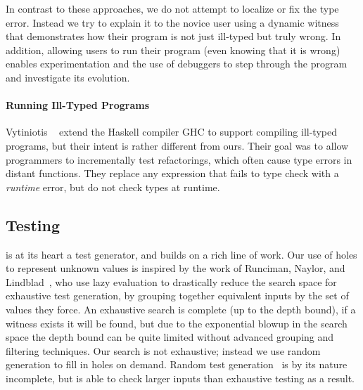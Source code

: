 In contrast to these approaches, we do not attempt to localize or fix
the type error. Instead we try to explain it to the novice user using a
dynamic witness that demonstrates how their program is not just
ill-typed but truly wrong. In addition, allowing users to run their
program (even knowing that it is wrong) enables experimentation and the
use of debuggers to step through the program and investigate its
evolution.

\paragraph{Running Ill-Typed Programs}
\label{sec:running-ill-typed}
Vytiniotis \etal~\cite{vytiniotis_equality_2012} extend the Haskell
compiler GHC to support compiling ill-typed programs, but their intent
is rather different from ours. Their goal was to allow programmers to
incrementally test refactorings, which often cause type errors in
distant functions. They replace any expression that fails to type
check with a \emph{runtime} error, but do not check types
at runtime.

\subsection{Testing}
\label{sec:testing}
\nanomaly is at its heart a test generator, and builds on a rich line of
work.
%
Our use of holes to represent unknown values is inspired by the work of
Runciman, Naylor, and Lindblad~\cite{runciman_smallcheck_2008,naylor_finding_2007,lindblad_property_2007},
%
who use lazy evaluation to drastically reduce the search space for
exhaustive test generation, by grouping together equivalent inputs by
the set of values they force. An exhaustive search is complete (up to
the depth bound), if a witness exists it will be found, but due to the
exponential blowup in the search space the depth bound can be quite
limited without advanced grouping and filtering techniques.
%
Our search is not exhaustive; instead we use random generation to fill
in holes on demand.
%
Random test generation~\cite{claessen_quickcheck:_2000,csallner_jcrasher:_2004,pacheco_feedback-directed_2007}
%
is by its nature incomplete, but is able to check larger inputs than
exhaustive testing as a result.

